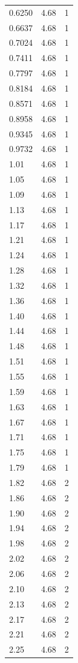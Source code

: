 \begin{longtable}{lrr}
  0.6250 & 4.68 & 1 \\
  0.6637 & 4.68 & 1 \\
  0.7024 & 4.68 & 1 \\
  0.7411 & 4.68 & 1 \\
  0.7797 & 4.68 & 1 \\
  0.8184 & 4.68 & 1 \\
  0.8571 & 4.68 & 1 \\
  0.8958 & 4.68 & 1 \\
  0.9345 & 4.68 & 1 \\
  0.9732 & 4.68 & 1 \\
  1.01 & 4.68 & 1 \\
  1.05 & 4.68 & 1 \\
  1.09 & 4.68 & 1 \\
  1.13 & 4.68 & 1 \\
  1.17 & 4.68 & 1 \\
  1.21 & 4.68 & 1 \\
  1.24 & 4.68 & 1 \\
  1.28 & 4.68 & 1 \\
  1.32 & 4.68 & 1 \\
  1.36 & 4.68 & 1 \\
  1.40 & 4.68 & 1 \\
  1.44 & 4.68 & 1 \\
  1.48 & 4.68 & 1 \\
  1.51 & 4.68 & 1 \\
  1.55 & 4.68 & 1 \\
  1.59 & 4.68 & 1 \\
  1.63 & 4.68 & 1 \\
  1.67 & 4.68 & 1 \\
  1.71 & 4.68 & 1 \\
  1.75 & 4.68 & 1 \\
  1.79 & 4.68 & 1 \\
  1.82 & 4.68 & 2 \\
  1.86 & 4.68 & 2 \\
  1.90 & 4.68 & 2 \\
  1.94 & 4.68 & 2 \\
  1.98 & 4.68 & 2 \\
  2.02 & 4.68 & 2 \\
  2.06 & 4.68 & 2 \\
  2.10 & 4.68 & 2 \\
  2.13 & 4.68 & 2 \\
  2.17 & 4.68 & 2 \\
  2.21 & 4.68 & 2 \\
  2.25 & 4.68 & 2 \\

\end{longtable}
